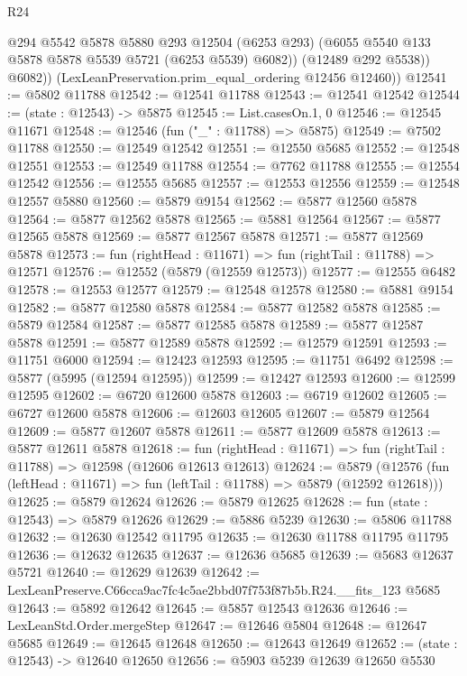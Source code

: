 \begin{lexlean}{R24}
\begin{coremodule}
              @294
              @5542
              @5878
              @5880
              @293
              @12504
              (@6253 @293)
              (@6055 @5540 @133 @5878 @5878 @5539 @5721 (@6253 @5539) @6082))
            (@12489 @292 @5538))
          @6082))
      (LexLeanPreservation.prim_equal_ordering @12456 @12460))
@12541 := @5802 @11788
@12542 := @12541 @11788
@12543 := @12541 @12542
@12544 := (state : @12543) -> @5875
@12545 := List.casesOn.{1, 0}
@12546 := @12545 @11671
@12548 := @12546 (fun ("_" : @11788) => @5875)
@12549 := @7502 @11788
@12550 := @12549 @12542
@12551 := @12550 @5685
@12552 := @12548 @12551
@12553 := @12549 @11788
@12554 := @7762 @11788
@12555 := @12554 @12542
@12556 := @12555 @5685
@12557 := @12553 @12556
@12559 := @12548 @12557 @5880
@12560 := @5879 @9154
@12562 := @5877 @12560 @5878
@12564 := @5877 @12562 @5878
@12565 := @5881 @12564
@12567 := @5877 @12565 @5878
@12569 := @5877 @12567 @5878
@12571 := @5877 @12569 @5878
@12573 := fun (rightHead : @11671) => fun (rightTail : @11788) => @12571
@12576 := @12552 (@5879 (@12559 @12573))
@12577 := @12555 @6482
@12578 := @12553 @12577
@12579 := @12548 @12578
@12580 := @5881 @9154
@12582 := @5877 @12580 @5878
@12584 := @5877 @12582 @5878
@12585 := @5879 @12584
@12587 := @5877 @12585 @5878
@12589 := @5877 @12587 @5878
@12591 := @5877 @12589 @5878
@12592 := @12579 @12591
@12593 := @11751 @6000
@12594 := @12423 @12593
@12595 := @11751 @6492
@12598 := @5877 (@5995 (@12594 @12595))
@12599 := @12427 @12593
@12600 := @12599 @12595
@12602 := @6720 @12600 @5878
@12603 := @6719 @12602
@12605 := @6727 @12600 @5878
@12606 := @12603 @12605
@12607 := @5879 @12564
@12609 := @5877 @12607 @5878
@12611 := @5877 @12609 @5878
@12613 := @5877 @12611 @5878
@12618 := fun (rightHead : @11671) => fun (rightTail : @11788) => @12598 (@12606 @12613 @12613)
@12624 := @5879
    (@12576 (fun (leftHead : @11671) => fun (leftTail : @11788) => @5879 (@12592 @12618)))
@12625 := @5879 @12624
@12626 := @5879 @12625
@12628 := fun (state : @12543) => @5879 @12626
@12629 := @5886 @5239
@12630 := @5806 @11788
@12632 := @12630 @12542 @11795
@12635 := @12630 @11788 @11795 @11795
@12636 := @12632 @12635
@12637 := @12636 @5685
@12639 := @5683 @12637 @5721
@12640 := @12629 @12639
@12642 := LexLeanPreserve.C66cca9ac7fc4c5ae2bbd07f753f87b5b.R24.__fits_123 @5685
@12643 := @5892 @12642
@12645 := @5857 @12543 @12636
@12646 := LexLeanStd.Order.mergeStep
@12647 := @12646 @5804
@12648 := @12647 @5685
@12649 := @12645 @12648
@12650 := @12643 @12649
@12652 := (state : @12543) -> @12640 @12650
@12656 := @5903 @5239 @12639 @12650 @5530

\end{coremodule}
\end{lexlean}
